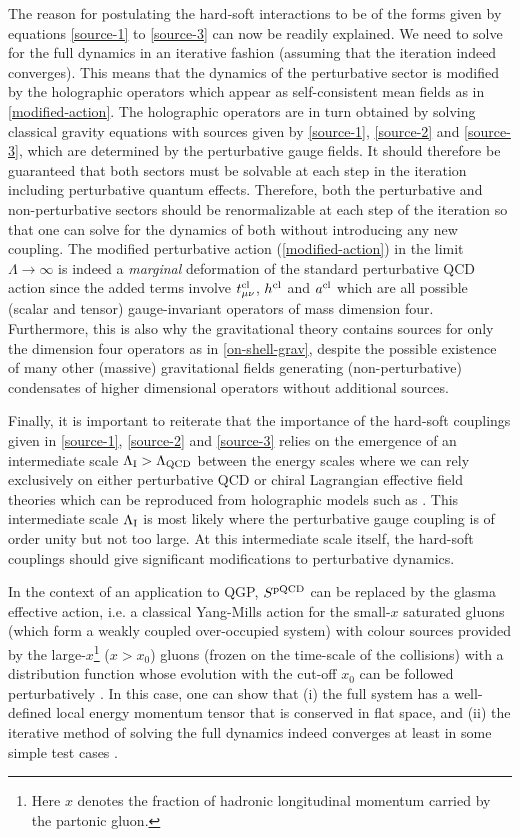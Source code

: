 \documentclass[prd,reprint,a4paper,showpacs,superscriptaddress,11pt,onecolumn,nofootinbib]{revtex4-1}
\renewcommand{\(}{\left(}
\renewcommand{\)}{\right)}
\newcommand{\6}{\partial}
\begin{document}
The reason for postulating the hard-soft interactions to be of the forms given by equations \eqref{source-1} to \eqref{source-3} can now be readily explained. We need to solve for the full dynamics in an iterative fashion (assuming that the iteration indeed converges). This means that the dynamics of the perturbative sector is modified by the holographic operators which appear as self-consistent mean fields as in \eqref{modified-action}. The holographic operators are in turn obtained by solving classical gravity equations with sources given by \eqref{source-1}, \eqref{source-2} and \eqref{source-3}, which are determined by the perturbative gauge fields. It should therefore be guaranteed that both sectors must be solvable at each step in the iteration including perturbative quantum effects. Therefore, both the perturbative and non-perturbative sectors should be renormalizable at each step of the iteration so that one can solve for the dynamics of both without introducing any new coupling. The modified perturbative action (\ref{modified-action}) in the limit $\Lambda \rightarrow \infty$ is indeed a \textit{marginal} deformation of the standard perturbative QCD action since the added terms involve $t^{\rm cl}_{\mu\nu}$, $h^{\rm cl}$ and $a^{\rm cl}$ which are all possible (scalar and tensor) gauge-invariant operators of mass dimension four. Furthermore, this is also why the gravitational theory contains sources for only the dimension four operators as in \eqref{on-shell-grav}, despite the possible existence of many other (massive) gravitational fields generating (non-perturbative) condensates of higher dimensional operators without additional sources. 

Finally, it is important to reiterate that the importance of the hard-soft couplings given in \eqref{source-1}, \eqref{source-2} and \eqref{source-3} relies on the emergence of an intermediate scale $\Lambda_{\rm I} > \Lambda_{\rm QCD}$ between the energy scales where we can rely exclusively on either perturbative QCD or chiral Lagrangian effective field theories which can be reproduced from holographic models such as \cite{Witten:1998zw,Sakai:2004cn,Sakai:2005yt}. This intermediate scale $\Lambda_{\rm I}$ is most likely where the perturbative gauge coupling is of order unity but not too large. At this intermediate scale itself, the hard-soft couplings should give significant modifications to perturbative dynamics.

In the context of an application to QGP, $S^{\rm pQCD}$ can be replaced by the glasma effective action, i.e. a classical Yang-Mills action for the small-$x$ saturated gluons (which form a weakly coupled over-occupied system) with colour sources provided by the large-$x$\footnote{Here $x$ denotes the fraction of hadronic longitudinal momentum carried by the partonic gluon.} ($x> x_0$) gluons (frozen on the time-scale of the collisions) with a distribution function whose evolution with the cut-off $x_0$ can be followed perturbatively \cite{Iancu:2000hn,Lappi:2006fp,Gelis:2010nm}. In this case, one can show that (i) the full system has a well-defined local energy momentum tensor that is conserved in flat space, and (ii) the iterative method of solving the full dynamics indeed converges at least in some simple test cases \cite{Mukhopadhyay:2015smb}. 
\end{document}
